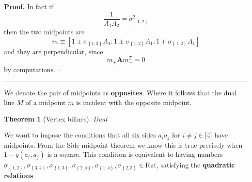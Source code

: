 \documentclass{unswthesis}
\newtheorem{theorem}{Theorem}
\newenvironment{proof}[1][Proof]{\noindent\textbf{#1.} }{\ \rule{0.5em}{0.5em}}
\begin{document}
\begin{proof}
In fact if%
\begin{equation*}
\frac{1}{A_{1}A_{2}}=\sigma _{\left\{ 1,2\right\} }^{2} 
\end{equation*}%
then the two midpoints are%
\begin{equation*}
m\equiv \left[ 1\pm \sigma _{\left\{ 1,2\right\} }A_{1}:1\pm \sigma
_{\left\{ 1,2\right\} }A_{1}:1\mp \sigma _{\left\{ 1,2\right\} }A_{1}\right] 
\end{equation*}%
and they are perpendicular, since%
\begin{equation*}
m_{+}\mathbf{A}m_{-}^{T}=0 
\end{equation*}%
by computations. $\square $
\end{proof}

We denote the pair of midpoints as \textbf{opposites}. Where it follows that
the dual line $M$ of a midpoint $m$ is incident with the opposite midpoint.

\begin{theorem}[Vertex bilines]
Dual
\end{theorem}

We want to impose the conditions that all six sides $\overline{a_{i}a_{j}}$
for $i\neq j\in \lbrack 4]$ have midpoints. From the Side midpoint theorem
we know this is true precisely when $1-q(a_{i},a_{j})$ is a square. This
condition is equivalent to having numbers $\sigma _{\left\{ 1,2\right\}
},\sigma _{\left\{ 3,4\right\} },\sigma _{\left\{ 1,3\right\} },\sigma
_{\left\{ 2,4\right\} },\sigma _{\left\{ 1,4\right\} },\sigma _{\left\{
2,3\right\} }\in \text{Rat}$, satisfying the \textbf{quadratic relations}
\end{document}
